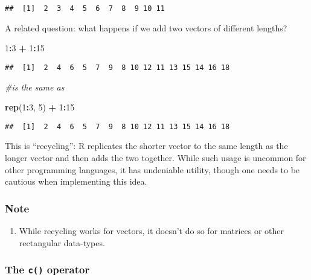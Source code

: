 \documentclass[11pt,]{article}
\newenvironment{Shaded}{\begin{snugshade}}{\end{snugshade}}
\newcommand{\KeywordTok}[1]{\textcolor[rgb]{0.13,0.29,0.53}{\textbf{#1}}}
\newcommand{\DecValTok}[1]{\textcolor[rgb]{0.00,0.00,0.81}{#1}}
\newcommand{\StringTok}[1]{\textcolor[rgb]{0.31,0.60,0.02}{#1}}
\newcommand{\CommentTok}[1]{\textcolor[rgb]{0.56,0.35,0.01}{\textit{#1}}}
\newcommand{\OperatorTok}[1]{\textcolor[rgb]{0.81,0.36,0.00}{\textbf{#1}}}
\newcommand{\NormalTok}[1]{#1}
\providecommand{\tightlist}{%
  \setlength{\itemsep}{0pt}\setlength{\parskip}{0pt}}
\begin{document}
\begin{verbatim}
##  [1]  2  3  4  5  6  7  8  9 10 11
\end{verbatim}

A related question: what happens if we add two vectors of different
lengths?

\begin{Shaded}
\begin{Highlighting}[]
\DecValTok{1}\OperatorTok{:}\DecValTok{3} \OperatorTok{+}\StringTok{ }\DecValTok{1}\OperatorTok{:}\DecValTok{15}
\end{Highlighting}
\end{Shaded}

\begin{verbatim}
##  [1]  2  4  6  5  7  9  8 10 12 11 13 15 14 16 18
\end{verbatim}

\begin{Shaded}
\begin{Highlighting}[]
\CommentTok{#is the same as}

\KeywordTok{rep}\NormalTok{(}\DecValTok{1}\OperatorTok{:}\DecValTok{3}\NormalTok{, }\DecValTok{5}\NormalTok{) }\OperatorTok{+}\StringTok{ }\DecValTok{1}\OperatorTok{:}\DecValTok{15}
\end{Highlighting}
\end{Shaded}

\begin{verbatim}
##  [1]  2  4  6  5  7  9  8 10 12 11 13 15 14 16 18
\end{verbatim}

This is ``recycling'': R replicates the shorter vector to the same
length as the longer vector and then adds the two together. While such
usage is uncommon for other programming languages, it has undeniable
utility, though one needs to be cautious when implementing this idea.

\subsubsection{Note}\label{note}

\begin{enumerate}
\def\labelenumi{\arabic{enumi}.}
\tightlist
\item
  While recycling works for vectors, it doesn't do so for matrices or
  other rectangular data-types.
\end{enumerate}

\subsubsection{\texorpdfstring{The \texttt{c()}
operator}{The c() operator}}\label{the-c-operator}
\end{document}
